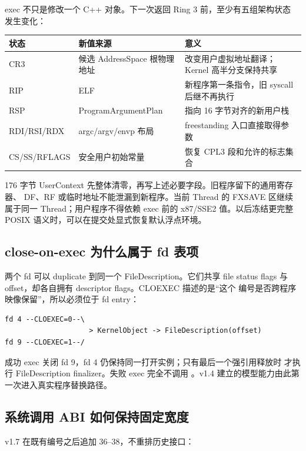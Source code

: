 exec 不只是修改一个 C++ 对象。下一次返回 Ring 3 前，至少有五组架构状态
发生变化：

\begin{longtable}{L{0.19\textwidth}L{0.31\textwidth}L{0.39\textwidth}}
\toprule
状态 & 新值来源 & 意义\\
\midrule
CR3 & 候选 AddressSpace 根物理地址 & 改变用户虚拟地址翻译；Kernel 高半分支保持共享\\
RIP & ELF  & 新程序第一条指令，旧 syscall 后继不再执行\\
RSP & ProgramArgumentPlan & 指向 16 字节对齐的新用户栈\\
RDI/RSI/RDX & argc/argv/envp 布局 & freestanding 入口直接取得参数\\
CS/SS/RFLAGS & 安全用户初始常量 & 恢复 CPL3 段和允许的标志集合\\
\bottomrule
\end{longtable}

176 字节 UserContext 先整体清零，再写上述必要字段。旧程序留下的通用寄存器、
DF、RF 或临时地址不能泄漏到新程序。当前 Thread 的 FXSAVE 区继续属于同一
Thread；用户程序不得依赖 exec 前的 x87/SSE2 值。以后冻结更完整 POSIX
语义时，可以在提交处显式恢复默认浮点环境。

\subsection{close-on-exec 为什么属于 fd 表项}

两个 fd 可以 duplicate 到同一个 FileDescription。它们共享 file status
flags 与 offset，却各自拥有 descriptor flags。CLOEXEC 描述的是“这个
编号是否跨程序映像保留”，所以必须位于 fd entry：

\begin{lstlisting}[caption={共享打开实例与独立 CLOEXEC}]
fd 4 --CLOEXEC=0--\
                    > KernelObject -> FileDescription(offset)
fd 9 --CLOEXEC=1--/
\end{lstlisting}

成功 exec 关闭 fd 9，fd 4 仍保持同一打开实例；只有最后一个强引用释放时
才执行 FileDescription finalizer。失败 exec 完全不调用
。v1.4 建立的模型能力由此第一次进入真实程序替换路径。

\subsection{系统调用 ABI 如何保持固定宽度}

v1.7 在既有编号之后追加 36--38，不重排历史接口：

